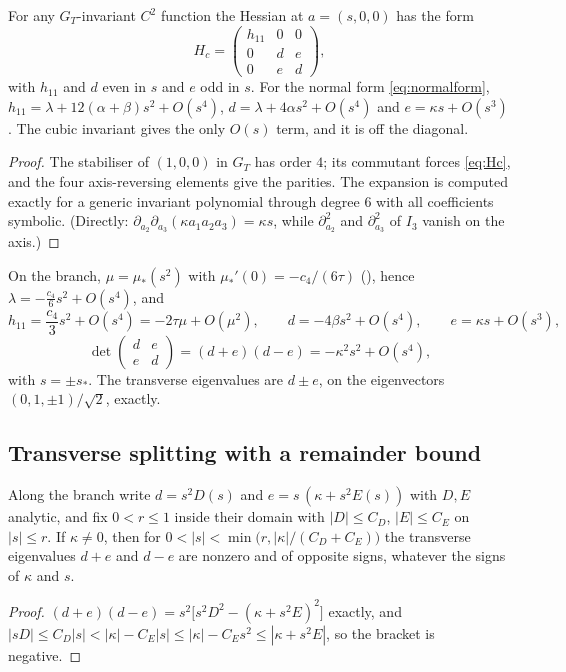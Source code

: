\begin{lemma}\label{lem:hessform}
For any $G_T$-invariant $C^2$ function the Hessian at $a=(s,0,0)$ has the form
\begin{equation}\label{eq:Hc}
H_c=\begin{pmatrix}h_{11}&0&0\\0&d&e\\0&e&d\end{pmatrix},
\end{equation}
with $h_{11}$ and $d$ even in $s$ and $e$ odd in $s$. For the normal form \eqref{eq:normalform},
$h_{11}=\lambda+12(\alpha+\beta)s^2+O(s^4)$, $d=\lambda+4\alpha s^2+O(s^4)$ and $e=\kappa s+O(s^3)$. The cubic invariant gives
the only $O(s)$ term, and it is off the diagonal.
\end{lemma}
\begin{proof}
The stabiliser of $(1,0,0)$ in $G_T$ has order $4$; its commutant forces \eqref{eq:Hc}, and the four axis-reversing
elements give the parities. The expansion is computed exactly for a generic invariant polynomial through degree $6$
with all coefficients symbolic. (Directly: $\partial_{a_2}\partial_{a_3}(\kappa a_1a_2a_3)=\kappa s$, while $\partial_{a_2}^2$ and
$\partial_{a_3}^2$ of $I_3$ vanish on the axis.)
\end{proof}

On the branch, $\mu=\mu_*(s^2)$ with $\mu_*'(0)=-c_4/(6\tau)$ (\propBtwo), hence $\lambda=-\frac{c_4}{6}s^2+O(s^4)$, and
\begin{equation}\label{eq:branchhess}
h_{11}=\frac{c_4}{3}s^2+O(s^4)=-2\tau\mu+O(\mu^2),\qquad d=-4\beta s^2+O(s^4),\qquad e=\kappa s+O(s^3),
\end{equation}
\begin{equation}\label{eq:det}
\det\begin{pmatrix}d&e\\e&d\end{pmatrix}=(d+e)(d-e)=-\kappa^2s^2+O(s^4),
\end{equation}
with $s=\pm s_*$. The transverse eigenvalues are $d\pm e$, on the eigenvectors $(0,1,\pm1)/\sqrt2$, exactly.

\subsection{Transverse splitting with a remainder bound}

\begin{lemma}\label{lem:remainder}
Along the branch write $d=s^2D(s)$ and $e=s\,(\kappa+s^2E(s))$ with $D,E$ analytic, and fix $0<r\le1$ inside their domain
with $|D|\le C_D$, $|E|\le C_E$ on $|s|\le r$. If $\kappa\ne0$, then for $0<|s|<\min\bigl(r,|\kappa|/(C_D+C_E)\bigr)$
the transverse eigenvalues $d+e$ and $d-e$ are nonzero and of opposite signs, whatever the signs of $\kappa$ and $s$.
\end{lemma}
\begin{proof}
$(d+e)(d-e)=s^2\bigl[s^2D^2-(\kappa+s^2E)^2\bigr]$ exactly, and
$|sD|\le C_D|s|<|\kappa|-C_E|s|\le|\kappa|-C_Es^2\le|\kappa+s^2E|$, so the bracket is negative.
\end{proof}

